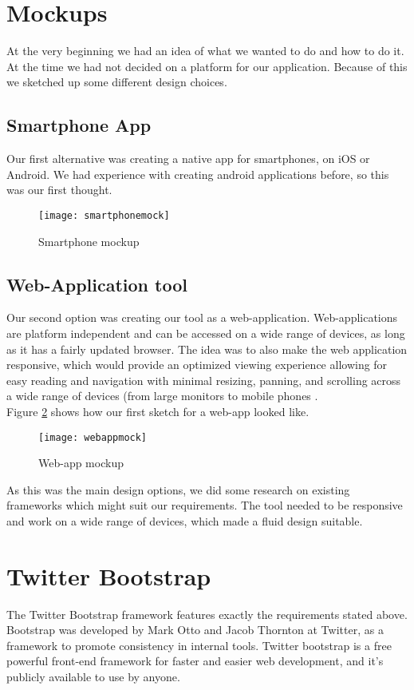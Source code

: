 \section{Mockups}
At the very beginning we had an idea of what we wanted to do and how to do it. At the time we had not decided on a platform for our application. Because of this we sketched up some different design choices.

\subsection{Smartphone App}
Our first alternative was creating a native app for smartphones, on iOS or Android. We had experience with creating android applications before, so this was our first thought. 
\begin{figure}[H]
\centering
	\texttt{[image: smartphonemock]}
\caption{Smartphone mockup}
\label{smartphonemock}
\end{figure}

\subsection{Web-Application tool}
Our second option was creating our tool as a web-application. Web-applications are platform independent and can be accessed on a wide range of devices, as long as it has a fairly updated browser. The idea was to also make the web application responsive, which would provide an optimized viewing experience allowing for easy reading and navigation with minimal resizing, panning, and scrolling across a wide range of devices (from large monitors to mobile phones .\\
Figure \ref{webappmock} shows how our first sketch for a web-app looked like.
\begin{figure}[H]
\centering 
	\texttt{[image: webappmock]}
\caption{Web-app mockup}
\label{webappmock}
\end{figure}
As this was the main design options, we did some research on existing frameworks which might suit our requirements. The tool needed to be responsive and work on a wide range of devices, which made a fluid design suitable.

\section{Twitter Bootstrap}
The Twitter Bootstrap framework\citep{twitterbootstrap} features exactly the requirements stated above. Bootstrap was developed by Mark Otto and Jacob Thornton at Twitter, as a framework to promote consistency in internal tools\citep{buildingbootstrap}. Twitter bootstrap is a free powerful front-end framework for faster and easier web development, and it's publicly available to use by anyone.

